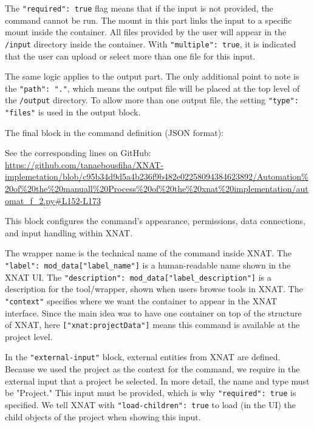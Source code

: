 The \texttt{"required": true} flag means that if the input is not provided, the command cannot be run. The mount in this part links the input to a specific mount inside the container. All files provided by the user will appear in the \texttt{/input} directory inside the container. With \texttt{"multiple": true}, it is indicated that the user can upload or select more than one file for this input.

The same logic applies to the output part. The only additional point to note is the \texttt{"path": "."}, which means the output file will be placed at the top level of the \texttt{/output} directory. To allow more than one output file, the setting \texttt{"type": "files"} is used in the output block.

The final block in the command definition (JSON format):




\noindent\footnotesize See the corresponding lines on GitHub:\url{ https://github.com/tanaebousfiha/XNAT-implemetation/blob/c95b34d9d5a4b236f9b482e02258094384623892/Automation%20of%20the%20manuall%20Process%20of%20the%20xnat%20implementation/automat_f_2.py#L152-L173}
\normalsize



This block configures the command's appearance, permissions, data connections, and input handling within XNAT.

The wrapper name is the technical name of the command inside XNAT. The \texttt{"label": mod\_data["label\_name"]} is a human-readable name shown in the XNAT \ac{UI}. The \texttt{"description": mod\_data["label\_description"]} is a description for the tool/wrapper, shown when users browse tools in XNAT. The \texttt{"context"} specifies where we want the container to appear in the XNAT interface. Since the main idea was to have one container on top of the structure of XNAT, here \texttt{["xnat:projectData"]} means this command is available at the project level.


In the \texttt{"external-input"} block, external entities from XNAT are defined. Because we used the project as the context for the command, we require in the external input that a project be selected. In more detail, the name and type must be "Project." This input must be provided, which is why \texttt{"required": true} is specified. We tell XNAT with \texttt{"load-children": true} to load (in the UI) the child objects of the project when showing this input.

